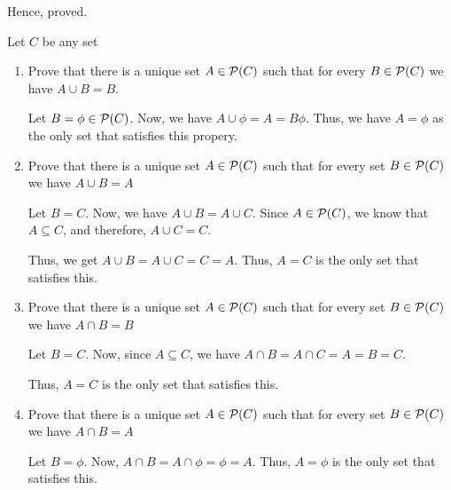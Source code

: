 Hence, proved.
\es

\bp
Let $C$ be any set
\begin{enumerate}
	\item Prove that there is a unique set $A \in \mathcal{P}(C)$ such that for every $B \in \mathcal{P}(C)$ we have $A \cup B = B$.

	      \bs
	      Let $B = \phi \in \mathcal{P}(C)$. Now, we have $A \cup \phi = A = B \phi$. Thus, we have $A = \phi$ as the only set that satisfies this propery.
	      \es

	\item Prove that there is a unique set $A \in \mathcal{P}(C)$ such that for every set $B \in \mathcal{P}(C)$ we have $A \cup B = A$

	      \bs
	      Let $B = C$. Now, we have $A \cup B = A \cup C$.
	      Since $A \in \mathcal{P}(C)$, we know that $A \subseteq C$, and therefore, $A \cup C = C$.

	      Thus, we get $A \cup B = A \cup C = C = A$. Thus, $A = C$ is the only set that satisfies this.
	      \es

	\item Prove that there is a unique set $A \in \mathcal{P}(C)$ such that for every set $B \in \mathcal{P}(C)$ we have $A \cap B = B$

	      \bs
	      Let $B = C$. Now, since $A \subseteq C$, we have $A \cap B = A \cap C = A = B = C$.

	      Thus, $A = C$ is the only set that satisfies this.
	      \es

	\item Prove that there is a unique set $A \in \mathcal{P}(C)$ such that for every set $B \in \mathcal{P}(C)$ we have $A \cap B = A$

	      \bs
	      Let $B = \phi$. Now, $A \cap B = A \cap \phi = \phi = A$.
	      Thus, $A = \phi$ is the only set that satisfies this.
	      \es
\end{enumerate}
\ep

